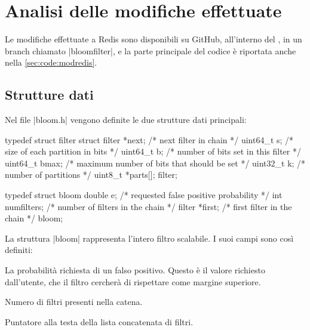 \section{Analisi delle modifiche effettuate}
\label{sec:patchexplain}

Le modifiche effettuate a Redis sono disponibili su GitHub, all'interno del
, in un branch
chiamato \cverb|bloomfilter|, e la parte principale del codice è riportata anche
nella \autoref{sec:code:modredis}.

\subsection{Strutture dati}

Nel file \cverb|bloom.h| vengono definite le due strutture dati principali:

\begin{commentedsource}[style=csource,caption=Strutture dati,label={lst:bloomStruct}]
typedef struct filter {
    struct filter *next;  /* next filter in chain */
    uint64_t s;           /* size of each partition in bits */
    uint64_t b;           /* number of bits set in this filter */
    uint64_t bmax;        /* maximum number of bits that should be set */
    uint32_t k;           /* number of partitions */
    uint8_t *parts[];
} filter;

typedef struct bloom {
	double e;             /* requested false positive probability */
	int numfilters;       /* number of filters in the chain */
	filter *first;        /* first filter in the chain */
} bloom;
\end{commentedsource}

La struttura \cverb|bloom| rappresenta l'intero filtro scalabile. I suoi campi sono
così definiti:

\begin{description}[labelindent=2\parindent,leftmargin=!,labelwidth=8em,font={\bfseries\ttfamily}]
  \item[double e] La probabilità richiesta di un falso positivo. Questo è il valore richiesto
      dall'utente, che il filtro cercherà di rispettare come margine superiore.
  \item[int numfilters] Numero di filtri presenti nella catena.
  \item[filter *first] Puntatore alla testa della lista concatenata di filtri.
\end{description}

